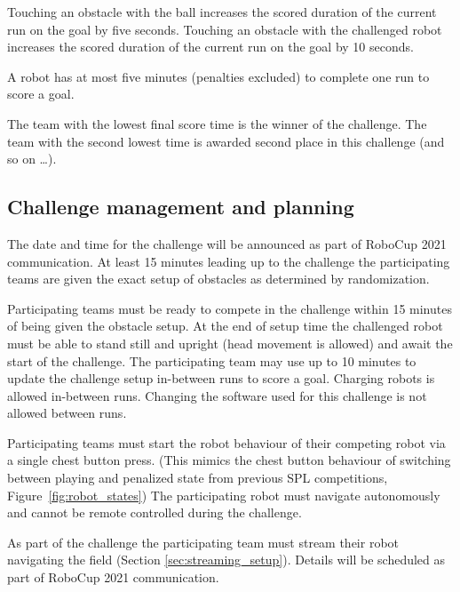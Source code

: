 Touching an obstacle with the ball increases the scored duration of the current run on the goal by five seconds. Touching an obstacle with the challenged robot increases the scored duration of the current run on the goal by 10 seconds.

A robot has at most five minutes (penalties excluded) to complete one run to score a goal.

The team with the lowest final score time is the winner of the challenge. The team with the second lowest time is awarded second place in this challenge (and so on \ldots).

\subsection{Challenge management and planning}

The date and time for the challenge will be announced as part of RoboCup 2021 communication. At least 15 minutes leading up to the challenge the participating teams are given the exact setup of obstacles as determined by randomization.

Participating teams must be ready to compete in the challenge within 15 minutes of being given the obstacle setup. At the end of setup time the challenged robot must be able to stand still and upright (head movement is allowed) and await the start of the challenge. The participating team may use up to 10 minutes to update the challenge setup in-between runs to score a goal. Charging robots is allowed in-between runs. Changing the software used for this challenge is not allowed between runs.

Participating teams must start the robot behaviour of their competing robot via a single chest button press. (This mimics the chest button behaviour of switching between playing and penalized state from previous SPL competitions, \cf Figure~\ref{fig:robot_states}) The participating robot must navigate autonomously and cannot be remote controlled during the challenge.

As part of the challenge the participating team must stream their robot navigating the field (\cf Section \ref{sec:streaming_setup}). Details will be scheduled as part of RoboCup 2021 communication.

